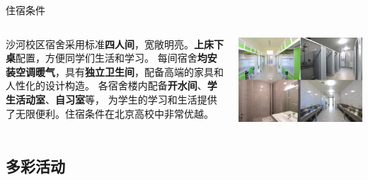 \documentclass[aspectratio=169, utf8]{beamer}
\begin{document}
\begin{frame}{住宿条件}
    \begin{columns}
        \setlength{\parindent}{2em}

        沙河校区宿舍采用标准\textcolor{Fore}{\textbf{四人间}}，宽敞明亮。\textcolor{Fore}{\textbf{上床下桌}}配置，方便同学们生活和学习。
        每间宿舍\textcolor{Fore}{\textbf{均安装空调暖气}}，具有\textcolor{Fore}{\textbf{独立卫生间}}，配备高端的家具和人性化的设计构造。
        各宿舍楼内配备\textcolor{Fore}{\textbf{开水间}}、\textcolor{Fore}{\textbf{学生活动室}}、\textcolor{Fore}{\textbf{自习室}}等，
        为学生的学习和生活提供了无限便利。住宿条件在北京高校中非常优越。

        \includegraphics[width=\textwidth]{./resources/24.png}
    \end{columns}
\end{frame}

\subsection*{多彩活动}
\end{document}
